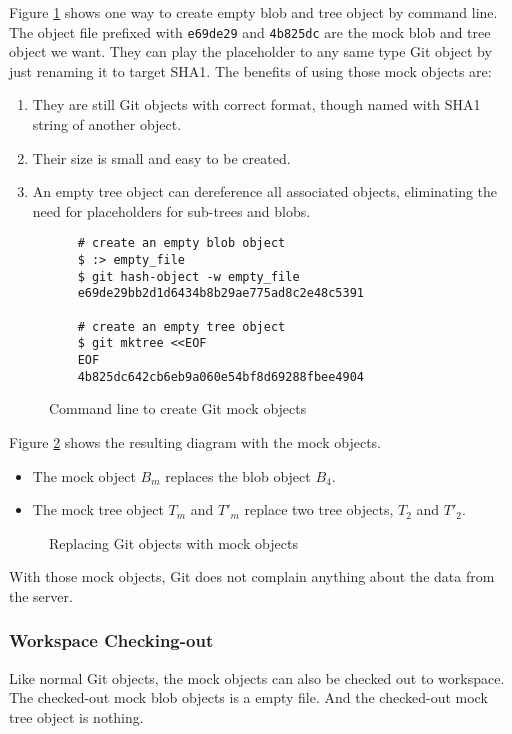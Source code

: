 \documentclass[preprint]{sigplanconf}
\begin{document}
Figure \ref{fig:cmd-create-mock} shows one way to create empty blob and tree object by command line.
The object file prefixed with \verb|e69de29| and \verb|4b825dc| are the mock blob and tree object we want.
They can play the placeholder to any same type Git object by just renaming it to target SHA1.
The benefits of using those mock objects are:
\begin{enumerate}
  \item They are still Git objects with correct format, though named with SHA1 string of another object.
  \item Their size is small and easy to be created.
  \item An empty tree object can dereference all associated objects, eliminating the need for placeholders for sub-trees and blobs.
\end{enumerate}


\begin{figure}[htpb]
  \centering
  \begin{verbatim}
    # create an empty blob object
    $ :> empty_file
    $ git hash-object -w empty_file
    e69de29bb2d1d6434b8b29ae775ad8c2e48c5391

    # create an empty tree object
    $ git mktree <<EOF
    EOF
    4b825dc642cb6eb9a060e54bf8d69288fbee4904
  \end{verbatim}
  \caption{Command line to create Git mock objects}
  \label{fig:cmd-create-mock}
\end{figure}

Figure \ref{fig:mock-objects} shows the resulting diagram with the mock objects.

\begin{itemize}
  \item The mock object $B_m$ replaces the blob object $B_4$.
  \item The mock tree object $T_m$ and $T'_m$ replace two tree objects, $T_2$ and $T'_2$.
\end{itemize}

\begin{figure}[htpb]
  \centering
  
  \caption{Replacing Git objects with mock objects}
  \label{fig:mock-objects}
\end{figure}

With those mock objects, Git does not complain anything about the data from the server.

\subsubsection{Workspace Checking-out}
Like normal Git objects, the mock objects can also be checked out to workspace.
The checked-out mock blob objects is a empty file.
And the checked-out mock tree object is nothing.
\end{document}
